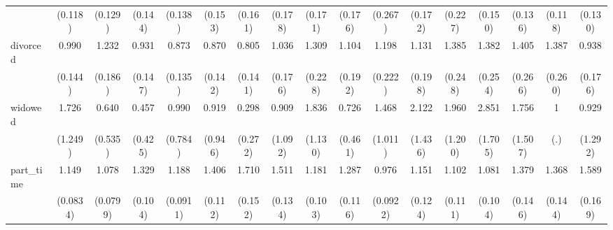 {\begin{tabular}{l*{16}{c}}
                    &     (0.118)         &     (0.129)         &     (0.144)         &     (0.138)         &     (0.153)         &     (0.161)         &     (0.178)         &     (0.171)         &     (0.176)         &     (0.267)         &     (0.172)         &     (0.227)         &     (0.150)         &     (0.136)         &     (0.118)         &     (0.130)         \\
[1em]
divorced            &       0.990         &       1.232         &       0.931         &       0.873         &       0.870         &       0.805         &       1.036         &       1.309         &       1.104         &       1.198         &       1.131         &       1.385         &       1.382         &       1.405         &       1.387         &       0.938         \\
                    &     (0.144)         &     (0.186)         &     (0.147)         &     (0.135)         &     (0.142)         &     (0.141)         &     (0.176)         &     (0.228)         &     (0.192)         &     (0.222)         &     (0.198)         &     (0.248)         &     (0.254)         &     (0.266)         &     (0.260)         &     (0.176)         \\
[1em]
widowed             &       1.726         &       0.640         &       0.457         &       0.990         &       0.919         &       0.298         &       0.909         &       1.836         &       0.726         &       1.468         &       2.122         &       1.960         &       2.851         &       1.756         &           1         &       0.929         \\
                    &     (1.249)         &     (0.535)         &     (0.425)         &     (0.784)         &     (0.946)         &     (0.272)         &     (1.092)         &     (1.130)         &     (0.461)         &     (1.011)         &     (1.436)         &     (1.200)         &     (1.705)         &     (1.507)         &         (.)         &     (1.292)         \\
[1em]
part\_time           &       1.149         &       1.078         &       1.329\sym{***}&       1.188\sym{*}  &       1.406\sym{***}&       1.710\sym{***}&       1.511\sym{***}&       1.181         &       1.287\sym{**} &       0.976         &       1.151         &       1.102         &       1.081         &       1.379\sym{**} &       1.368\sym{**} &       1.589\sym{***}\\
                    &    (0.0834)         &    (0.0799)         &     (0.104)         &    (0.0911)         &     (0.112)         &     (0.152)         &     (0.134)         &     (0.103)         &     (0.116)         &    (0.0922)         &     (0.124)         &     (0.111)         &     (0.104)         &     (0.146)         &     (0.144)         &     (0.169)         \\

\end{tabular}}
